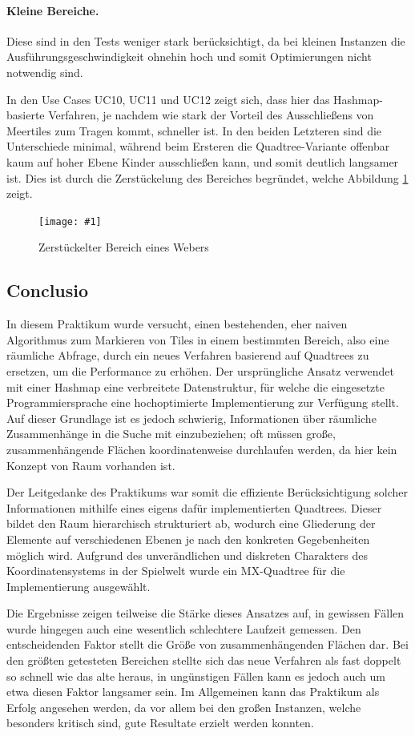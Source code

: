 \documentclass[%
			paper=a4,%
			DIV12,
			liststotoc,
			bibtotoc,
			draft=false,%
			titlepage,
			numbers=noendperiod
			]{scrartcl}
\newcommand{\myfig}[5] {
 \begin{figure}[tbph]
	 \centering
	 \texttt{[image: \#1]}
	 \caption[#4]{#5}
	 \label{fig:#2}
 \end{figure}
}
\begin{document}
\paragraph{Kleine Bereiche.}
Diese sind in den Tests weniger stark berücksichtigt, da bei kleinen Instanzen die Ausführungsgeschwindigkeit ohnehin hoch und somit Optimierungen nicht notwendig sind.

In den Use Cases UC10, UC11 und UC12 zeigt sich, dass hier das Hashmap-basierte Verfahren, je nachdem wie stark der Vorteil des Ausschließens von Meertiles zum Tragen kommt, schneller ist.
In den beiden Letzteren sind die Unterschiede minimal, während beim Ersteren die Quadtree-Variante offenbar kaum auf hoher Ebene Kinder ausschließen kann, und somit deutlich langsamer ist. 
Dies ist durch die Zerstückelung des Bereiches begründet, welche Abbildung \ref{fig:weaver} zeigt.

\myfig{img/weaver}{weaver}{width=.6\textwidth}{Zerstückelter Bereich eines Webers}{Zerstückelter Bereich eines Webers}

\subsection{Conclusio}

In diesem Praktikum wurde versucht, einen bestehenden, eher naiven Algorithmus zum Markieren von Tiles in einem bestimmten Bereich, also eine räumliche Abfrage, durch ein neues Verfahren basierend auf Quadtrees zu ersetzen, um die Performance zu erhöhen.
Der ursprüngliche Ansatz verwendet mit einer Hashmap eine verbreitete Datenstruktur, für welche die eingesetzte Programmiersprache eine hochoptimierte Implementierung zur Verfügung stellt.
Auf dieser Grundlage ist es jedoch schwierig, Informationen über räumliche Zusammenhänge in die Suche mit einzubeziehen; oft müssen große, zusammenhängende Flächen koordinatenweise durchlaufen werden, da hier kein Konzept von Raum vorhanden ist.

Der Leitgedanke des Praktikums war somit die effiziente Berücksichtigung solcher Informationen mithilfe eines eigens dafür implementierten Quadtrees.
Dieser bildet den Raum hierarchisch strukturiert ab, wodurch eine Gliederung der Elemente auf verschiedenen Ebenen je nach den konkreten Gegebenheiten möglich wird.
Aufgrund des unverändlichen und diskreten Charakters des Koordinatensystems in der Spielwelt wurde ein MX-Quadtree für die Implementierung ausgewählt.

Die Ergebnisse zeigen teilweise die Stärke dieses Ansatzes auf, in gewissen Fällen wurde hingegen auch eine wesentlich schlechtere Laufzeit gemessen.
Den entscheidenden Faktor stellt die Größe von zusammenhängenden Flächen dar. 
Bei den größten getesteten Bereichen stellte sich das neue Verfahren als fast doppelt so schnell wie das alte heraus, in ungünstigen Fällen kann es jedoch auch um etwa diesen Faktor langsamer sein.
Im Allgemeinen kann das Praktikum als Erfolg angesehen werden, da vor allem bei den großen Instanzen, welche besonders kritisch sind, gute Resultate erzielt werden konnten.
\end{document}
